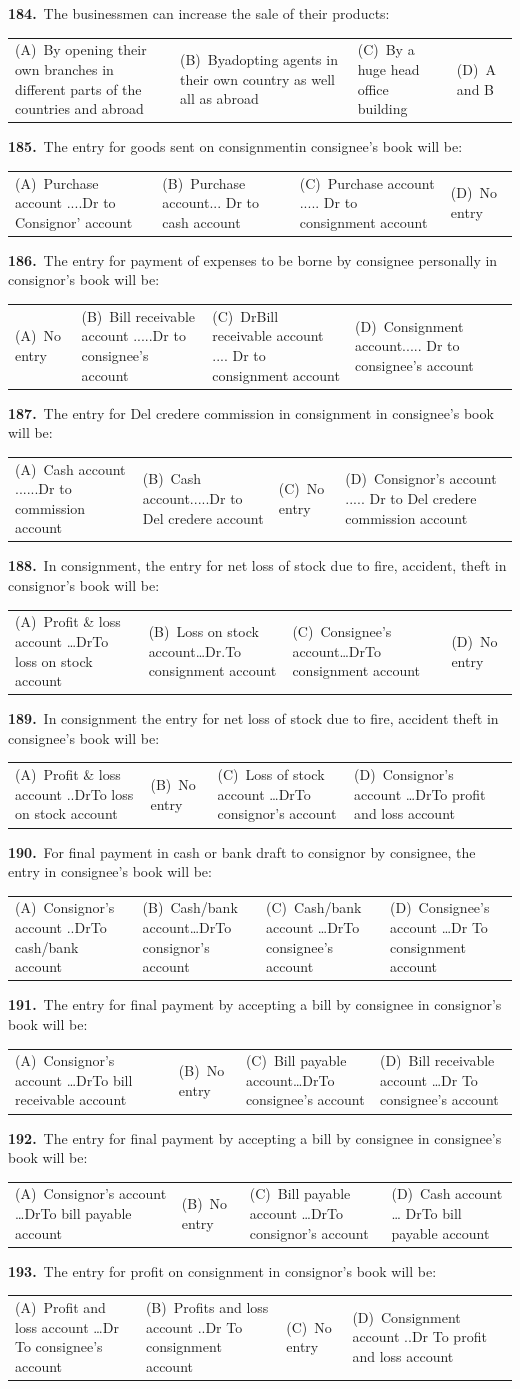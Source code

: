 \documentclass[11pt,a4paper]{article}
\makeatletter
\newcommand{\mcq}[6]{%
  \Needspace{4\baselineskip}%
  \par\medskip\noindent\textbf{#1.}\ #2\par\nopagebreak
  \noindent\begin{tabularx}{\linewidth}{@{\hspace{1.5em}}*{4}{>{\raggedright\arraybackslash}X}@{}}
    (A)~#3 & (B)~#4 & (C)~#5 & (D)~#6
  \end{tabularx}\par}
\makeatother
\begin{document}
\mcq{184}{The businessmen can increase the sale of their products:}{By opening their own branches in different parts of the countries and abroad}{Byadopting agents in their own country as well all as abroad}{By a huge head office building}{A and B}
\mcq{185}{The entry for goods sent on consignmentin consignee's book will be:}{Purchase account ....Dr to Consignor' account}{Purchase account... Dr to cash account}{Purchase account ..... Dr to consignment account}{No entry}
\mcq{186}{The entry for payment of expenses to be borne by consignee personally in consignor's book will be:}{No entry}{Bill receivable account .....Dr to consignee's account}{DrBill receivable account .... Dr to consignment account}{Consignment account..... Dr to consignee's account}
\mcq{187}{The entry for Del credere commission in consignment in consignee's book will be:}{Cash account ......Dr to commission account}{Cash account.....Dr to Del credere account}{No entry}{Consignor's account ..... Dr to Del credere commission account}
\mcq{188}{In consignment, the entry for net loss of stock due to fire, accident, theft in consignor’s book will be:}{Profit \& loss account …DrTo loss on stock account}{Loss on stock account…Dr.To consignment account}{Consignee’s account…DrTo consignment account}{No entry}
\mcq{189}{In consignment the entry for net loss of stock due to fire, accident theft in consignee’s book will be:}{Profit \& loss account ..DrTo loss on stock account}{No entry}{Loss of stock account …DrTo consignor’s account}{Consignor’s account …DrTo profit and loss account}
\mcq{190}{For final payment in cash or bank draft to consignor by consignee, the entry in consignee’s book will be:}{Consignor’s account ..DrTo cash/bank account}{Cash/bank account…DrTo consignor’s account}{Cash/bank account …DrTo consignee’s account}{Consignee’s account …Dr To consignment account}
\mcq{191}{The entry for final payment by accepting a bill by consignee in consignor’s book will be:}{Consignor’s account …DrTo bill receivable account}{No entry}{Bill payable account…DrTo consignee’s account}{Bill receivable account …Dr To consignee’s account}
\mcq{192}{The entry for final payment by accepting a bill by consignee in consignee’s book will be:}{Consignor’s account …DrTo bill payable account}{No entry}{Bill payable account …DrTo consignor’s account}{Cash account … DrTo bill payable account}
\mcq{193}{The entry for profit on consignment in consignor’s book will be:}{Profit and loss account …Dr To consignee’s account}{Profits and loss account ..Dr To consignment account}{No entry}{Consignment account ..Dr To profit and loss account}
\end{document}

